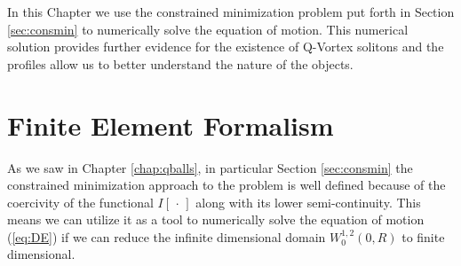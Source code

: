 In this Chapter we use the constrained minimization problem put forth in Section \ref{sec:consmin} to numerically solve the equation of motion. This numerical solution provides further evidence for the existence of Q-Vortex solitons and the profiles allow us to better understand the nature of the objects.

\section{Finite Element Formalism}
As we saw in Chapter \ref{chap:qballs}, in particular Section \ref{sec:consmin} the constrained minimization approach to the problem is well defined because of the coercivity of the functional $I[\,\cdot\,]$ along with its lower semi-continuity. This means we can utilize it as a tool to numerically solve the equation of motion (\ref{eq:DE}) if we can reduce the infinite dimensional domain $W^{1,2}_0(0,R)$ to finite dimensional.

